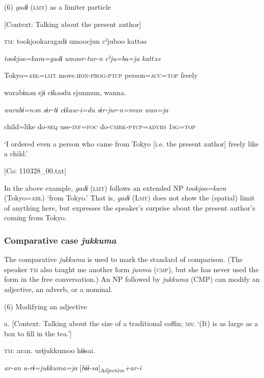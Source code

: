 (6)  \textit{gadɨ} (\textsc{lmt}) as a limiter particle

  [Context: Talking about the present author]

  \textsc{tm}:  tookjookaragadɨ  umoocjun  cˀjuboo  kattəə

    \textit{tookjoo=kara=gadɨ}  \textit{umoor-tur-n}  \textit{cˀju=ba=ja}  \textit{kattəə}

    Tokyo=\textsc{abl}=\textsc{lmt}  move.\textsc{hon}-\textsc{prog}-\textsc{ptcp}  person=\textsc{acc}=\textsc{top}  freely

    warabɨnən  sjɨ  cɨkəədu  sjunmun,  wanna.

    \textit{warabɨ=nən}  \textit{sɨr-tɨ}  \textit{cɨkaw-i=du}  \textit{sɨr-jur-n=mun}  \textit{wan=ja}

    child=like  do-\textsc{seq}  use-\textsc{inf}=\textsc{foc}  do-\textsc{umrk}-\textsc{ptcp}=\textsc{advrs}  1\textsc{sg}=\textsc{top}

    ‘I ordered even a person who came from Tokyo [i.e. the present author] freely like a child.’

    [Co: 110328\_00.txt]

In the above example, \textit{gadɨ} (\textsc{lmt}) follows an extended NP \textit{tookjoo=kara} (Tokyo=\textsc{abl}) ‘from Tokyo.’ That is, \textit{gadɨ} (L\textsc{mt}) does not show the (spatial) limit of anything here, but expresses the speaker’s surprise about the present author’s coming from Tokyo.

\subsubsection{Comparative case \textit{jukkuma}}

The comparative \textit{jukkuma} is used to mark the standard of comparison. (The speaker \textsc{tm} also taught me another form \textit{junma} (\textsc{cmp}), but she has never used the form in the free conversation.) An NP followed by \textit{jukkuma} (CMP) can modify an adjective, an adverb, or a nominal.

(6)  Modifying an adjective

  a.  [Context: Talking about the size of a traditional coffin; \textsc{ms}: ‘(It) is as large as a box to fill in the tea.’]

    \textsc{tm}:  aran.  urɨjukkumoo  hɨɨsai.

      \textit{ar-an}  \textit{u-rɨ=jukkuma=ja}  [\textit{hɨɨ-sa}]\textsubscript{Adjective}\textit{+ar-i}

